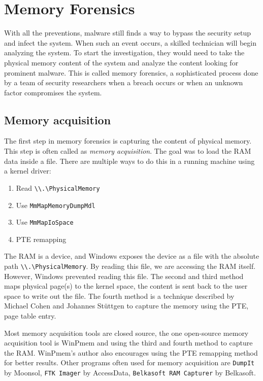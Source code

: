 \section[Memory Forensics]{Memory Forensics}

With all the preventions, malware still finds a way to bypass the security
setup and infect the system. When such an event occurs, a skilled technician
will begin analyzing the system. To start the investigation, they would need to
take the physical memory content of the system and analyze the content looking
for prominent malware. This is called memory forensics, a sophisticated process
done by a team of security researchers when a breach occurs or when an unknown
factor compromises the system.

\subsection[Memory acquisition]{Memory acquisition}

The first step in memory forensics is capturing the content of physical memory.
This step is often called as \textit{memory acquisition}. The goal was to load
the RAM data inside a file. There are multiple ways \cite{memoryAcquisition} to
do this in a running machine using a kernel driver:

\begin{enumerate}
\item Read \texttt{\textbackslash\textbackslash.\textbackslash PhysicalMemory}
\item Use \texttt{MmMapMemoryDumpMdl}
\item Use \texttt{MmMapIoSpace}
\item PTE remapping
\end{enumerate}

The RAM is a device, and Windows exposes the device as a file with the absolute
path \texttt{\textbackslash\textbackslash.\textbackslash PhysicalMemory}. By
reading this file, we are accessing the RAM itself. However, Windows prevented
reading this file. The second and third method maps physical page(s) to the
kernel space, the content is sent back to the user space to write out the file.
The fourth method is a technique described by Michael Cohen and Johannes
Stüttgen \cite{pteremap} to capture the memory using the PTE, page table entry.

Most memory acquisition tools are closed source, the one open-source memory
acquisition tool is WinPmem \cite{winpmem} and using the third and fourth
method to capture the RAM. WinPmem's author also encourages using the PTE
remapping method for better results. Other programs often used for memory
acquisition are \texttt{DumpIt} by Moonsol, \texttt{FTK Imager} by AccessData,
\texttt{Belkasoft RAM Capturer} by Belkasoft.

